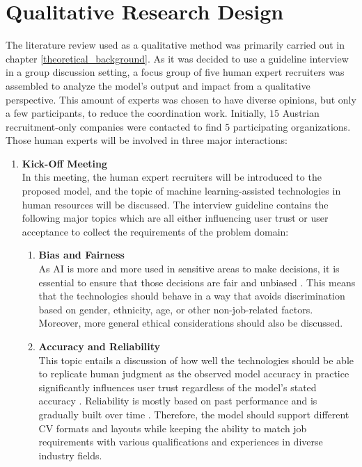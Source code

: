 \documentclass[draft,final]{thesisclass} %
\begin{document}
\section{Qualitative Research Design} \label{qualitative_research_design}
The literature review used as a qualitative method was primarily carried out in chapter \ref{theoretical_background}.
As it was decided to use a guideline interview in a group discussion setting, a focus group of five human expert recruiters was assembled to analyze the model's output and impact from a qualitative perspective.
This amount of experts was chosen to have diverse opinions, but only a few participants, to reduce the coordination work.
Initially, $15$ Austrian recruitment-only companies were contacted to find $5$ participating organizations.
Those human experts will be involved in three major interactions:
\begin{enumerate}
    \item \textbf{Kick-Off Meeting} \label{kick_off_meeting}\\
    In this meeting, the human expert recruiters will be introduced to the proposed model, and the topic of machine learning-assisted technologies in human resources will be discussed.
    The interview guideline contains the following major topics which are all either influencing user trust or user acceptance to collect the requirements of the problem domain:
    \begin{enumerate}
        \item \textbf{Bias and Fairness} \parencite{ml_bias_fairness}\\
        As \acs{AI} is more and more used in sensitive areas to make decisions, it is essential to ensure that those decisions are fair and unbiased \parencite[1]{ml_bias_fairness}.
        This means that the technologies should behave in a way that avoids discrimination based on gender, ethnicity, age, or other non-job-related factors.
        Moreover, more general ethical considerations should also be discussed.
        \item \textbf{Accuracy and Reliability} \parencite{accuracy_trust_relationship}\\
        This topic entails a discussion of how well the technologies should be able to replicate human judgment as the observed model accuracy in practice significantly influences user trust regardless of the model's stated accuracy \parencite[10]{accuracy_trust_relationship}.
        Reliability is mostly based on past performance and is gradually built over time \parencite[11]{ai_reliability}. Therefore, the model should support different \acs{CV} formats and layouts while keeping the ability to match job requirements with various qualifications and experiences in diverse industry fields.

\end{enumerate}
\end{enumerate}
\end{document}
